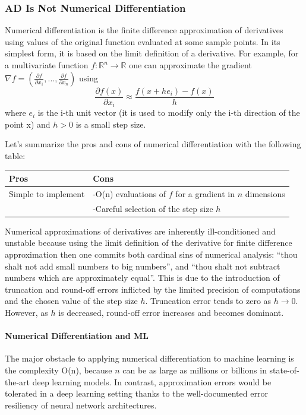\subsubsection{AD Is Not Numerical Differentiation}
Numerical differentiation is the finite difference approximation of derivatives using values of the original function evaluated at some sample points. In its simplest form, it is based on the limit definition of a derivative. For example, for a multivariate function $f:\mathbb{R}^n\rightarrow \mathbb{R}$ one can approximate the gradient $\nabla f = (\frac{\partial f}{\partial x_1},...,\frac{\partial f}{\partial x_n})$ using
$$ \frac{\partial f (x)}{\partial x_i} \approx \frac{f(x+he_i)-f(x)}{h} $$
where $e_i$ is the i-th unit vector (it is used to modify only the i-th direction of the point x) and $h>0$ is a small step size.

Let's summarize the pros and cons of numerical differentiation with the following table:

\begin{center}
\begin{tabular}{ |l|l| } 
\hline
 Pros & Cons\\
\hline
Simple to implement & -O(n) evaluations of $f$ for a gradient in $n$ dimensions \\ 
 & -Careful selection of the step size $h$ \\ \hline
\end{tabular}
\end{center}
Numerical approximations of derivatives are inherently ill-conditioned and unstable  because using the limit definition of the derivative for finite difference approximation then one commits both cardinal sins of numerical analysis: “thou shalt not add small numbers to big numbers”, and “thou shalt not subtract numbers which are approximately equal”. This is due to the introduction of truncation and round-off errors inflicted by the limited precision of computations and the chosen value of the step size $h$. Truncation error tends to zero as $h \rightarrow 0$. However, as $h$ is decreased, round-off error increases and becomes dominant.

\paragraph{Numerical Differentiation and ML} The major obstacle to applying numerical differentiation to machine learning is the complexity O(n), because $n$ can be as large as millions or billions in state-of-the-art deep learning models. In contrast, approximation errors would be tolerated in a deep learning setting thanks to the well-documented error resiliency of neural network architectures.

